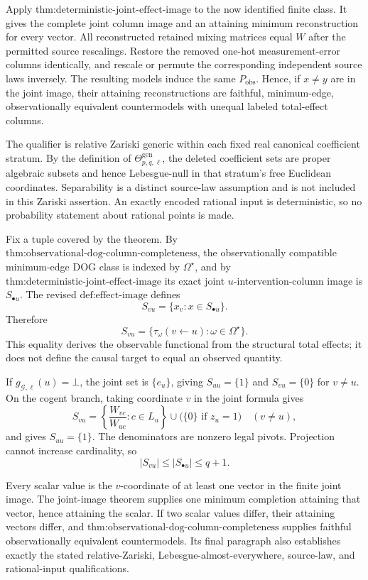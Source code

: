Apply \(\text{thm:deterministic-joint-effect-image}\) to the now identified finite class.  It gives the complete joint column image and an attaining minimum reconstruction for every vector.  All reconstructed retained mixing matrices equal \(W\) after the permitted source rescalings.  Restore the removed one-hot measurement-error columns identically, and rescale or permute the corresponding independent source laws inversely.  The resulting models induce the same \(P_{\mathrm{obs}}\).  Hence, if \(x\ne y\) are in the joint image, their attaining reconstructions are faithful, minimum-edge, observationally equivalent countermodels with unequal labeled total-effect columns.

The qualifier is relative Zariski generic within each fixed real canonical coefficient stratum.  By the definition of \(\Theta_{p,q,\ell}^{\mathrm{gen}}\), the deleted coefficient sets are proper algebraic subsets and hence Lebesgue-null in that stratum's free Euclidean coordinates.  Separability is a distinct source-law assumption and is not included in this Zariski assertion.  An exactly encoded rational input is deterministic, so no probability statement about rational points is made.

Fix a tuple covered by the theorem.  By \(\text{thm:observational-dog-column-completeness}\), the observationally compatible minimum-edge DOG class is indexed by \(\Omega^\star\), and by \(\text{thm:deterministic-joint-effect-image}\) its exact joint \(u\)-intervention-column image is \(S_{\bullet u}\).  The revised \(\text{def:effect-image}\) defines
\[
S_{vu}=\{x_v:x\in S_{\bullet u}\}.
\]
Therefore
\[
S_{vu}
=\{\tau_\omega(v\leftarrow u):\omega\in\Omega^\star\}.
\]
This equality derives the observable functional from the structural total effects; it does not define the causal target to equal an observed quantity.

If \(g_{\mathcal G,\ell}(u)=\bot\), the joint set is \(\{e_u\}\), giving \(S_{uu}=\{1\}\) and \(S_{vu}=\{0\}\) for \(v\ne u\).  On the cogent branch, taking coordinate \(v\) in the joint formula gives
\[
S_{vu}
=\left\{\frac{W_{vc}}{W_{uc}}:c\in L_u\right\}
\cup\bigl(\{0\}\text{ if }z_u=1\bigr)
\quad(v\ne u),
\]
and gives \(S_{uu}=\{1\}\).  The denominators are nonzero legal pivots.  Projection cannot increase cardinality, so
\[
|S_{vu}|\le |S_{\bullet u}|\le q+1.
\]

Every scalar value is the \(v\)-coordinate of at least one vector in the finite joint image.  The joint-image theorem supplies one minimum completion attaining that vector, hence attaining the scalar.  If two scalar values differ, their attaining vectors differ, and \(\text{thm:observational-dog-column-completeness}\) supplies faithful observationally equivalent countermodels.  Its final paragraph also establishes exactly the stated relative-Zariski, Lebesgue-almost-everywhere, source-law, and rational-input qualifications.

